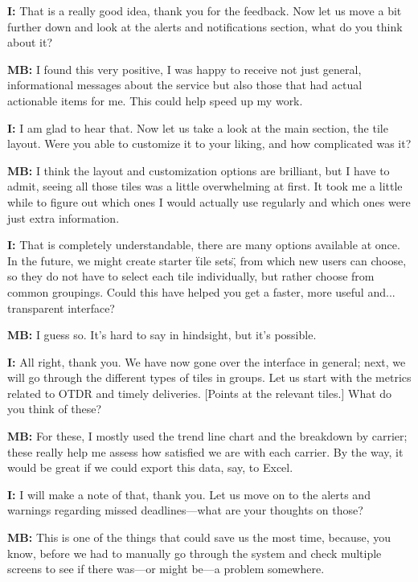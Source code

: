 \documentclass{imc-inf}
\begin{document}
\begin{appendices}
  \noindent\textbf{I:} That is a really good idea, thank you for the feedback. Now let us move a bit further down and look at the alerts and notifications section, what do you think about it?

  \noindent\textbf{MB:} I found this very positive, I was happy to receive not just general, informational messages about the service but also those that had actual actionable items for me. This could help speed up my work.

  \noindent\textbf{I:} I am glad to hear that. Now let us take a look at the main section, the tile layout. Were you able to customize it to your liking, and how complicated was it?

  \noindent\textbf{MB:} I think the layout and customization options are brilliant, but I have to admit, seeing all those tiles was a little overwhelming at first. It took me a little while to figure out which ones I would actually use regularly and which ones were just extra information.

  \noindent\textbf{I:} That is completely understandable, there are many options available at once. In the future, we might create starter \"tile sets\", from which new users can choose, so they do not have to select each tile individually, but rather choose from common groupings. Could this have helped you get a faster, more useful and... transparent interface?

  \noindent\textbf{MB:} I guess so. It's hard to say in hindsight, but it's possible.

  \noindent\textbf{I:} All right, thank you. We have now gone over the interface in general; next, we will go through the different types of tiles in groups. Let us start with the metrics related to OTDR and timely deliveries. [Points at the relevant tiles.] What do you think of these?

  \noindent\textbf{MB:} For these, I mostly used the trend line chart and the breakdown by carrier; these really help me assess how satisfied we are with each carrier. By the way, it would be great if we could export this data, say, to Excel.

  \noindent\textbf{I:} I will make a note of that, thank you. Let us move on to the alerts and warnings regarding missed deadlines—what are your thoughts on those?

  \noindent\textbf{MB:} This is one of the things that could save us the most time, because, you know, before we had to manually go through the system and check multiple screens to see if there was—or might be—a problem somewhere.


\end{appendices}
\end{document}
